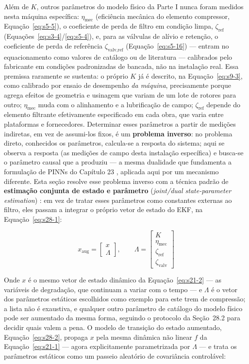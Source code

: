 \documentclass[12pt,a4paper]{article}
\numberwithin{equation}{section}
\numberwithin{table}{section}
\numberwithin{figure}{section}
\begin{document}
Além de $K$, outros parâmetros do modelo físico da Parte I nunca foram medidos nesta máquina específica: $\eta_{\text{mec}}$ (eficiência mecânica do elemento compressor, Equação~\eqref{eq:s5-5}), o coeficiente de perda de filtro em condição limpa, $\zeta_{\text{ref}}$ (Equações~\eqref{eq:s3-4}/\eqref{eq:s5-4}), e, para as válvulas de alívio e retenção, o coeficiente de perda de referência $\zeta_{\text{valv,ref}}$ (Equação~\eqref{eq:s5-16}) — entram no equacionamento como valores de catálogo ou de literatura — calibrados pelo fabricante em condições padronizadas de bancada, não na instalação real. Essa premissa raramente se sustenta: o próprio $K$ já é descrito, na Equação~\eqref{eq:s9-3}, como calibrado por ensaio de desempenho \textit{da máquina}, precisamente porque agrega efeitos de geometria e usinagem que variam de um lote de rotores para outro; $\eta_{\text{mec}}$ muda com o alinhamento e a lubrificação de campo; $\zeta_{\text{ref}}$ depende do elemento filtrante efetivamente especificado em cada obra, que varia entre plataformas e fornecedores. Determinar esses parâmetros a partir de medições indiretas, em vez de assumi-los fixos, é um \textbf{problema inverso}: no problema direto, conhecidos os parâmetros, calcula-se a resposta do sistema; aqui se observa a resposta (as medições de campo desta instalação específica) e busca-se o parâmetro causal que a produziu — a mesma dualidade que fundamenta a formulação de PINNs do Capítulo 23 \cite{piml}, aplicada aqui por um mecanismo diferente. Esta seção resolve esse problema inverso com a técnica padrão de \textbf{estimação conjunta de estado e parâmetro} (\textit{joint/dual state-parameter estimation}) \cite{simon}: em vez de tratar esses parâmetros como constantes externas ao filtro, eles passam a integrar o próprio vetor de estado do EKF, na Equação~\eqref{eq:s28-1}:

\begin{equation}\label{eq:s28-1}
x_{\text{aug}} = \begin{bmatrix} x \\ \Lambda \end{bmatrix}, \qquad \Lambda = \begin{bmatrix} K \\ \eta_{\text{mec}} \\ \zeta_{\text{ref}} \\ \zeta_{\text{valv}} \end{bmatrix}
\end{equation}

Onde $x$ é o mesmo vetor de estado dinâmico da Equação~\eqref{eq:s21-2} — as variáveis de degradação, que continuam a variar com o tempo — e $\Lambda$ é o vetor dos parâmetros estáticos escolhidos como exemplo para este trem de compressão; a lista não é exaustiva, e qualquer outro parâmetro de catálogo do modelo físico pode ser aumentado da mesma forma, seguindo o protocolo da Seção~28.2 para decidir quais valem a pena. O modelo de transição do estado aumentado, Equação~\eqref{eq:s28-2}, propaga $x$ pela mesma dinâmica não linear $f$ da Equação~\eqref{eq:s21-1} — agora explicitamente parametrizada por $\Lambda$ — e trata os parâmetros estáticos como um passeio aleatório de covariância controlável:
\end{document}
